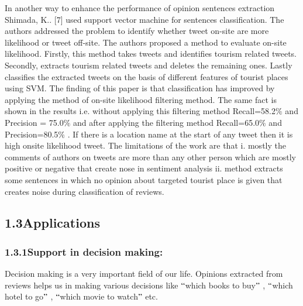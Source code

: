 \documentclass[12pt]{article}
\begin{document}
\vspace{\baselineskip}
\begin{justify}
\tab In another way to enhance the performance of opinion sentences extraction Shimada, K.. [7] used support vector machine for sentences classification. The authors addressed the problem to identify whether tweet on-site are more likelihood or tweet off-site. The authors proposed a method to evaluate on-site likelihood. Firstly, this method takes tweets and identifies tourism related tweets. Secondly, extracts tourism related tweets and deletes the remaining ones. Lastly classifies the extracted tweets on the basis of different features of tourist places using SVM. The finding of this paper is that classification has improved by applying the method of on-site likelihood filtering method. The same fact is shown in the results i.e. without applying this filtering method Recall=58.2$\%$  and Precision = 75.0$\%$  and after applying the filtering method Recall=65.0$\%$  and Precision=80.5$\%$ . If there is a location name at the start of any tweet then it is high onsite likelihood tweet. The limitations of the work are that i. mostly the comments of authors on tweets are more than any other person which are mostly positive or negative that create nose in sentiment analysis ii. method extracts some sentences in which no opinion about targeted tourist place is given that creates noise during classification of reviews.  
\end{justify}\par


\newpage

\vspace{\baselineskip}

\vspace{\baselineskip}
\subsection*{1.3\hspace*{10pt}Applications}
\subsubsection*{1.3.1\hspace*{10pt}Support in decision making:}
\begin{justify}
\tab Decision making is a very important field of our life. Opinions extracted from reviews helps us in making various decisions like $``$which books to buy$"$ , $``$which hotel to go$"$ , $``$which movie to watch$"$  etc.
\end{justify}\par
\end{document}
